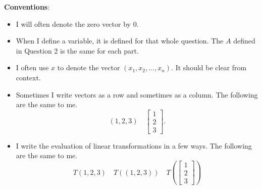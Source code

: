 \documentclass[addpoints]{exam}
\begin{document}
\textbf{Conventions}:
\begin{itemize}
    \item
        I will often denote the zero vector by $0$.
    \item
        When I define a variable, it is defined for that whole question. The $A$
        defined in Question 2 is the same for each part.
    \item
        I often use $x$ to denote the vector $(x_1,x_2,\ldots,x_n)$. It should be clear from context.
    \item
        Sometimes I write vectors as a row and sometimes as a column. The
        following are the same to me.
        \[
            (1,2,3) \quad
            \begin{bmatrix}
                1 \\
                2 \\
                3
            \end{bmatrix}.
        \]
    \item
        I write the evaluation of linear transformations in a few ways. The
        following are the same to me.
        \[
            T(1,2,3) \quad T((1,2,3)) \quad T \left(
            \begin{bmatrix}
                1 \\ 2\\ 3
            \end{bmatrix}
            \right)
        \]
\end{itemize}


\newpage
\end{document}
